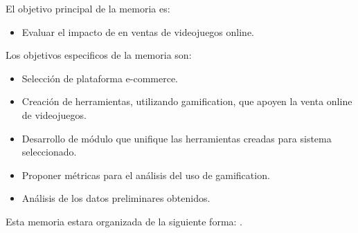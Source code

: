 El objetivo principal de la memoria es:

\begin{itemize}
    \item Evaluar el impacto de {\GAM} en ventas de videojuegos online.
\end{itemize}

Los objetivos especificos de la memoria son:
\begin{itemize}
    \item Selección de plataforma e-commerce.
    \item Creación de herramientas, utilizando gamification, que apoyen la
          venta online de videojuegos.
    \item Desarrollo de módulo que unifique las herramientas creadas para sistema
          seleccionado.
    \item Proponer métricas para el análisis del uso de gamification.
    \item Análisis de los datos preliminares obtenidos.
\end{itemize}

Esta memoria estara organizada de la siguiente forma:
.
